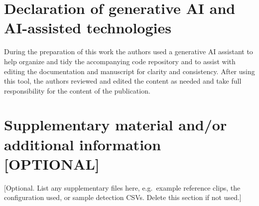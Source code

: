 \documentclass[final,3p,times]{elsarticle}
\begin{document}
\section*{Declaration of generative AI and AI-assisted technologies}

During the preparation of this work the authors used a generative AI assistant
to help organize and tidy the accompanying code repository and to assist with
editing the documentation and manuscript for clarity and consistency. After
using this tool, the authors reviewed and edited the content as needed and take
full responsibility for the content of the publication.

\section*{Supplementary material and/or additional information [OPTIONAL]}

[Optional. List any supplementary files here, e.g.\ example reference clips,
the configuration used, or sample detection CSVs. Delete this section if
not used.]
\end{document}
